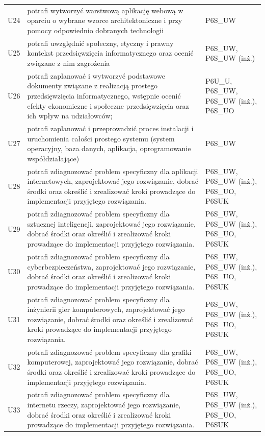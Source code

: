 \documentclass[12pt,a4paper]{article}
\begin{document}
{\begin{longtable}{m{1cm}m{9.5cm}m{3.9cm}}
\rowcolor{tableRowAlt} U24 & potrafi wytworzyć warstwową aplikację webową w oparciu o wybrane wzorce architektoniczne i przy pomocy odpowiednio dobranych technologii & {\scriptsize P6S\_UW} \\
\rowcolor{tableRowLight} U25 & potrafi uwzględnić społeczny, etyczny i prawny kontekst przedsięwzięcia informatycznego oraz ocenić związane z nim zagrożenia & {\scriptsize P6S\_UW, P6S\_UW {\scriptsize (inż.)}} \\
\rowcolor{tableRowAlt} U26 & potrafi zaplanować i wytworzyć podstawowe dokumenty związane z realizacją prostego przedsięwzięcia informatycznego, wstępnie ocenić efekty ekonomiczne i społeczne przedsięwzięcia oraz ich wpływ na udziałowców; & {\scriptsize P6U\_U, P6S\_UW, P6S\_UW {\scriptsize (inż.)}, P6S\_UO} \\
\rowcolor{tableRowLight} U27 & potrafi zaplanować i przeprowadzić  proces instalacji i uruchomienia całości prostego systemu (system operacyjny, baza danych, aplikacja, oprogramowanie współdziałające) & {\scriptsize P6S\_UW} \\
\rowcolor{tableRowAlt} U28 & potrafi zdiagnozować problem specyficzny dla aplikacji internetowych, zaprojektować jego rozwiązanie, dobrać środki oraz określić i zrealizować kroki prowadzące do implementacji przyjętego rozwiązania. & {\scriptsize P6S\_UW, P6S\_UW {\scriptsize (inż.)}, P6S\_UO, P6SUK} \\
\rowcolor{tableRowLight} U29 & potrafi zdiagnozować problem specyficzny dla sztucznej inteligencji, zaprojektować jego rozwiązanie, dobrać środki oraz określić i zrealizować kroki prowadzące do implementacji przyjętego rozwiązania. & {\scriptsize P6S\_UW, P6S\_UW {\scriptsize (inż.)}, P6S\_UO, P6SUK} \\
\rowcolor{tableRowAlt} U30 & potrafi zdiagnozować problem specyficzny dla cyberbezpieczeństwa, zaprojektować jego rozwiązanie, dobrać środki oraz określić i zrealizować kroki prowadzące do implementacji przyjętego rozwiązania. & {\scriptsize P6S\_UW, P6S\_UW {\scriptsize (inż.)}, P6S\_UO, P6SUK} \\
\rowcolor{tableRowLight} U31 & potrafi zdiagnozować problem specyficzny dla inżynierii gier komputerowych, zaprojektować jego rozwiązanie, dobrać środki oraz określić i zrealizować kroki prowadzące do implementacji przyjętego rozwiązania. & {\scriptsize P6S\_UW, P6S\_UW {\scriptsize (inż.)}, P6S\_UO, P6SUK} \\
\rowcolor{tableRowAlt} U32 & potrafi zdiagnozować problem specyficzny dla grafiki komputerowej, zaprojektować jego rozwiązanie, dobrać środki oraz określić i zrealizować kroki prowadzące do implementacji przyjętego rozwiązania. & {\scriptsize P6S\_UW, P6S\_UW {\scriptsize (inż.)}, P6S\_UO, P6SUK} \\
\rowcolor{tableRowLight} U33 & potrafi zdiagnozować problem specyficzny dla internetu rzeczy, zaprojektować jego rozwiązanie, dobrać środki oraz określić i zrealizować kroki prowadzące do implementacji przyjętego rozwiązania. & {\scriptsize P6S\_UW, P6S\_UW {\scriptsize (inż.)}, P6S\_UO, P6SUK} \\
\bottomrule
\end{longtable}}
\end{document}
